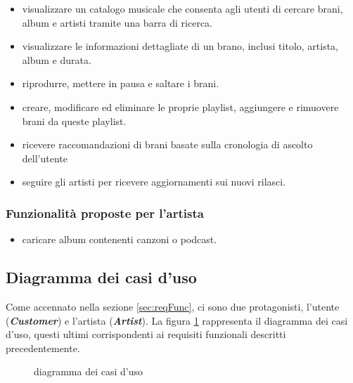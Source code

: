 \documentclass{article}
\begin{document}
  \begin{itemize}

    \item visualizzare un catalogo musicale che consenta agli utenti di cercare brani, album e artisti tramite una barra
    di ricerca.

    \item visualizzare le informazioni dettagliate di un brano, inclusi titolo, artista, album e durata.

    \item riprodurre, mettere in pausa e saltare i brani.

    \item creare, modificare ed eliminare le proprie playlist, aggiungere e rimuovere brani da queste playlist.

    \item ricevere raccomandazioni di brani basate sulla cronologia di ascolto dell'utente

    \item seguire gli artisti per ricevere aggiornamenti sui nuovi rilasci.

  \end{itemize}

  \subsubsection{Funzionalità proposte per l'artista}

  \begin{itemize}

    \item caricare album contenenti canzoni o podcast.

  \end{itemize}

  \subsection{Diagramma dei casi d'uso}

  Come accennato nella sezione \ref{sec:reqFunc}, ci sono due protagonisti, l'utente (\textbf{\textit{Customer}}) e l'artista (\textbf{\textit{Artist}}). La figura \ref{fig:useCaseDiagram} rappresenta il diagramma dei casi d'uso, questi ultimi corrispondenti ai requisiti funzionali descritti precedentemente.

  \begin{figure}[H]
    \centering
    
    \caption{diagramma dei casi d'uso}
    \label{fig:useCaseDiagram}
  \end{figure}
\end{document}
